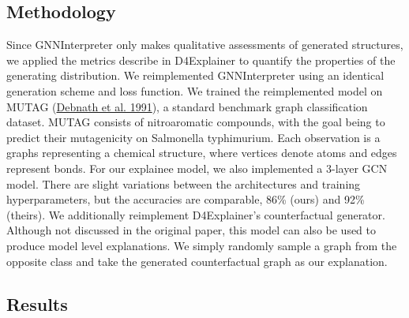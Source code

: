 \documentclass[
  11pt,
  letterpaper,
]{article}
\begin{document}
\hypertarget{methodology}{%
\subsection{Methodology}\label{methodology}}

\quad Since GNNInterpreter only makes qualitative assessments of
generated structures, we applied the metrics describe in D4Explainer to
quantify the properties of the generating distribution. We reimplemented
GNNInterpreter using an identical generation scheme and loss function.
We trained the reimplemented model on MUTAG
(\protect\hyperlink{ref-Debnath_1991}{Debnath et al. 1991}), a standard
benchmark graph classification dataset. MUTAG consists of nitroaromatic
compounds, with the goal being to predict their mutagenicity on
Salmonella typhimurium. Each observation is a graphs representing a
chemical structure, where vertices denote atoms and edges represent
bonds. For our explainee model, we also implemented a 3-layer GCN model.
There are slight variations between the architectures and training
hyperparameters, but the accuracies are comparable, 86\% (ours) and 92\%
(theirs). We additionally reimplement D4Explainer's counterfactual
generator. Although not discussed in the original paper, this model can
also be used to produce model level explanations. We simply randomly
sample a graph from the opposite class and take the generated
counterfactual graph as our explanation.

\hypertarget{results}{%
\subsection{Results}\label{results}}
\end{document}
